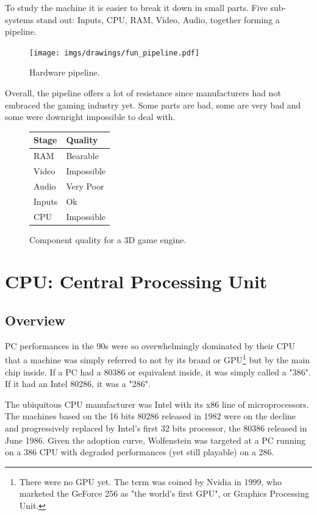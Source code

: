 \documentclass[book.tex]{subfiles}
\begin{document}
To study the machine it is easier to break it down in small parts. Five sub-systems stand out: Inputs, CPU, RAM, Video, Audio, together forming a pipeline.\\
\begin{figure}[H]
\centering
\texttt{[image: imgs/drawings/fun\_pipeline.pdf]}
\caption{Hardware pipeline.}
\label{fig:digraph}
\end{figure}

Overall, the pipeline offers a lot of resistance since manufacturers had not embraced the gaming industry yet. Some parts are bad, some are very bad and some were downright impossible to deal with.\\
\par

\begin{figure}[H]
\centering
\begin{tabularx}{\textwidth}{ X X  }
  \toprule
  \textbf{Stage} & \textbf{Quality} \\ \bottomrule
  RAM & Bearable \\ 
  Video & Impossible \\ 
  Audio & Very Poor \\ 
  Inputs & Ok \\ 
  CPU & Impossible \\ \bottomrule
\end{tabularx}
\caption{Component quality for a 3D game engine.}
\end{figure}



\section{CPU: Central Processing Unit}
  \subsection{Overview}
  PC performances in the 90s were so overwhelmingly dominated by their CPU that a machine was simply referred to not by its brand or GPU\footnote{There were no GPU yet. The term was coined by Nvidia in 1999, who marketed the GeForce 256 as "the world's first GPU", or Graphics Processing Unit.} but by the main chip inside. If a PC had a 80386 or equivalent inside, it was simply called a "386". If it had an Intel 80286, it was a "286".\\
\par
  The ubiquitous CPU manufacturer was Intel with its x86 line of microprocessors. The machines based on the 16 bits 80286 released in 1982 were on the decline and progressively replaced by Intel's first 32 bits processor, the 80386 released in June 1986. Given the adoption curve, Wolfenstein was targeted at a PC running on a 386 CPU with degraded performances (yet still playable) on a 286.\\
\par
\end{document}
